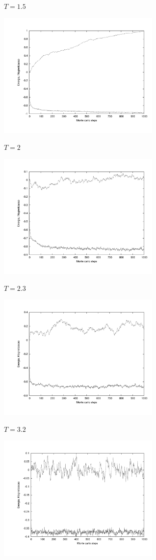 \documentclass[11pt]{beamer}
\begin{document}
\begin{frame}
\frametitle{\insertsection \\ {\small \insertsubsection}}
\begin{center}
{
\tiny $T=1.5$

\includegraphics[angle=0, width=0.6\textwidth, clip, trim = 1cm 2cm 1cm 2cm]{images/vars15}
}
{
\tiny $T=2$

\includegraphics[angle=0, width=0.6\textwidth, clip, trim = 1cm 2cm 1cm 2cm]{images/vars2}
}
{
\tiny $T=2.3$

\includegraphics[angle=0, width=0.6\textwidth, clip, trim = 1cm 2cm 1cm 2cm]{images/vars23}
}
{
\tiny $T=3.2$

\includegraphics[angle=0, width=0.6\textwidth, clip, trim = 1cm 2cm 1cm 2cm]{images/vars32}
}
\end{center}


\end{frame}
\end{document}
